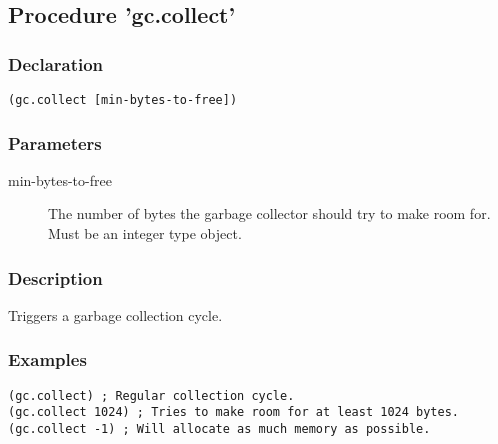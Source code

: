 \subsection{Procedure 'gc.collect'}
\label{builtins/gc.collect}

\subsubsection*{Declaration}
\begin{lstlisting}
(gc.collect [min-bytes-to-free])
\end{lstlisting}

\subsubsection*{Parameters}
\begin{description}
	\item[min-bytes-to-free] The number of bytes the garbage collector should try to make room for. Must be an integer type object.
\end{description}

\subsubsection*{Description}
Triggers a garbage collection cycle.

\subsubsection*{Examples}
\begin{lstlisting}
(gc.collect) ; Regular collection cycle.
(gc.collect 1024) ; Tries to make room for at least 1024 bytes.
(gc.collect -1) ; Will allocate as much memory as possible.
\end{lstlisting}
